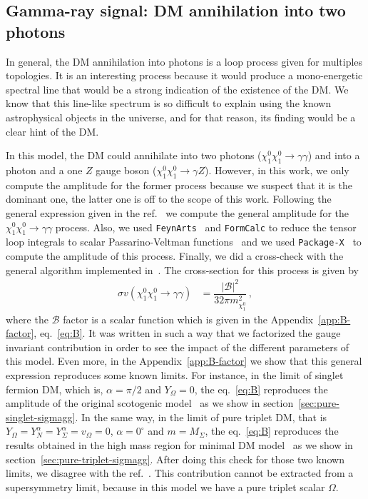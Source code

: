\documentclass[12pt,letterpaper]{article}
\begin{document}
\subsection{Gamma-ray signal: DM annihilation into two photons}
\label{sec:gamma-ray}
  
In general, the DM annihilation into photons is a loop process given for multiples topologies. 
It is an interesting process because it would produce a mono-energetic spectral line that would be a strong indication of the existence of the DM. We know that this line-like spectrum is so difficult to explain using the known astrophysical objects in the universe, and for that reason, its finding would be a clear hint of the DM.
     
In this model, the DM could annihilate into two photons ($\chi_1^0\chi_1^0\rightarrow\gamma\gamma$) and into a photon and a one $Z$ gauge boson ($\chi_1^0\chi_1^0\rightarrow\gamma Z$). 
However, in this work, we only compute the amplitude for the former process because we suspect that it is the dominant one, the latter one is off to the scope of this work.
Following the general expression given in the ref.~\cite{Garcia-Cely:2016hsk} we compute the general amplitude for the $\chi_1^0\chi_1^0\rightarrow\gamma\gamma$ process. 
Also, we used \texttt{FeynArts}~\cite{Hahn:2000kx} and \texttt{FormCalc} to reduce the tensor loop integrals to scalar Passarino-Veltman functions~\cite{Passarino:1978jh} and we used \texttt{Package-X}~\cite{Patel:2015tea} to compute the amplitude of this process. Finally, we did a cross-check with the general algorithm implemented in~\cite{Garcia-Cely:2016hsk}.
The cross-section for this process is given by
\begin{align}
\label{eq:sigmav-gg}
\sigma v (\chi^0_1\chi^0_1\rightarrow\gamma\gamma) &= \dfrac{|\mathcal{B}|^2}{32\pi m_{\chi^0_1}^2}\,,
\end{align}
where the $\mathcal{B}$ factor is a scalar function which is given in the Appendix~\ref{app:B-factor}, eq.~\ref{eq:B}. It was written in such a way that we factorized the gauge invariant contribution in order to see the impact of the different parameters of this model.
Even more, in the Appendix~\ref{app:B-factor} we show that this general expression reproduces some known limits. 
For instance, in the limit of singlet fermion DM, which is, $\alpha =\pi/2$ and $Y_{\Omega}=0$, the eq.~\ref{eq:B} reproduces the amplitude of the original scotogenic model~\cite{Garny:2015wea,Garcia-Cely:2016hsk} as we show in section~\ref{sec:pure-singlet-sigmagg}.
In the same way, in the limit of pure triplet DM, that is $Y_{\Omega}=Y_{N}^{\alpha}=Y_{\Sigma}^{\alpha}=v_{\Omega}=0$, $\alpha =0^{\circ}$ and $m=M_{\Sigma}$,  the eq.~\ref{eq:B} reproduces the results obtained in the high mass region for minimal DM model~\cite{Cirelli:2005uq} as we show in section~\ref{sec:pure-triplet-sigmagg}.
After doing this check for those two known limits, we disagree with the ref.~\cite{Choubey:2017yyn}. This contribution cannot be extracted from a supersymmetry limit, because in this model we have a pure triplet scalar $\Omega$.
\end{document}
